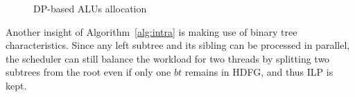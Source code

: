 \vspace{\textfig}
\begin{figure}[!ht]
    \begin{center}
        \hfill
        \hfill
    \end{center}
    \caption{DP-based ALUs allocation}
    \label{fig:alloc}
\end{figure}

\indent
Another insight of Algorithm~\ref{alg:intra} is making use of binary tree characteristics.
Since any left subtree and its sibling can be processed in parallel,
the scheduler can still balance the workload for two threads by splitting two subtrees from the root even if only one $bt$ remains in HDFG, 
and thus ILP is kept.





